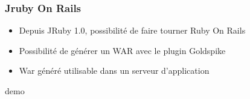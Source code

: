\documentclass{beamer}
\begin{document}
\begin{frame}
    \frametitle{Jruby On Rails}
    \begin{itemize}
        \item Depuis JRuby 1.0, possibilité de faire tourner Ruby On Rails
        \item Possibilité de générer un WAR avec le plugin Goldspike
        \item War généré utilisable dans un serveur d'application
    \end{itemize}
\end{frame}

\begin{frame}
    demo
\end{frame}
\end{document}
